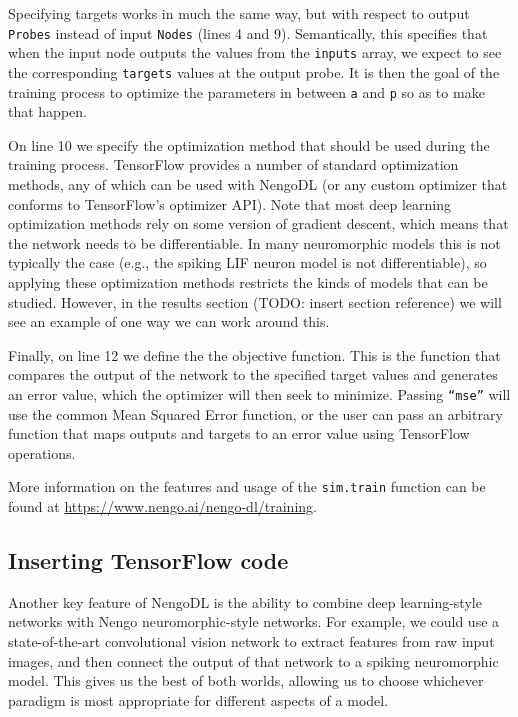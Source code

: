\documentclass{article}
\begin{document}
Specifying targets works in much the same way, but with respect to output \texttt{Probes} instead of input \texttt{Nodes} (lines 4 and 9).  Semantically, this specifies that when the input node outputs the values from the \texttt{inputs} array, we expect to see the corresponding \texttt{targets} values at the output probe.  It is then the goal of the training process to optimize the parameters in between \texttt{a} and \texttt{p} so as to make that happen.

On line 10 we specify the optimization method that should be used during the training process.  TensorFlow provides a number of standard optimization methods, any of which can be used with NengoDL (or any custom optimizer that conforms to TensorFlow's optimizer API).  Note that most deep learning optimization methods rely on some version of gradient descent, which means that the network needs to be differentiable.  In many neuromorphic models this is not typically the case (e.g., the spiking LIF neuron model is not differentiable), so applying these optimization methods restricts the kinds of models that can be studied.  However, in the results section (TODO: insert section reference) we will see an example of one way we can work around this.

Finally, on line 12 we define the the objective function.  This is the function that compares the output of the network to the specified target values and generates an error value, which the optimizer will then seek to minimize.  Passing \texttt{``mse''} will use the common Mean Squared Error function, or the user can pass an arbitrary function that maps outputs and targets to an error value using TensorFlow operations.

More information on the features and usage of the \texttt{sim.train} function can be found at \url{https://www.nengo.ai/nengo-dl/training}.

\subsection{Inserting TensorFlow code}

Another key feature of NengoDL is the ability to combine deep learning-style networks with Nengo neuromorphic-style networks.  For example, we could use a state-of-the-art convolutional vision network to extract features from raw input images, and then connect the output of that network to a spiking neuromorphic model.  This gives us the best of both worlds, allowing us to choose whichever paradigm is most appropriate for different aspects of a model.
\end{document}
